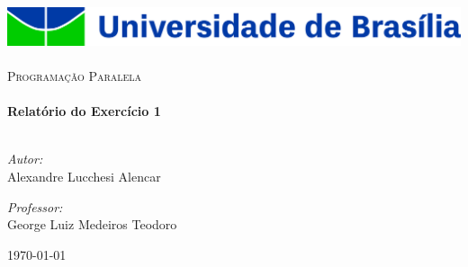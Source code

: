 \begin{titlepage}

\begin{center}

\includegraphics[width=1.0\textwidth]{img/unb_logo.jpg}~\\[1cm]

\textsc{\Large Programação Paralela}\\[0.5cm]

\HRule\\[0.4cm]
{\huge \bfseries Relatório do Exercício 1\\[0.4cm]}
\HRule\\[1.5cm]

\begin{minipage}{0.4\textwidth}
\begin{flushleft} \large
\textit{Autor:}\\
\small{Alexandre Lucchesi Alencar}
\end{flushleft}
\end{minipage}
\begin{minipage}{0.4\textwidth}
\begin{flushright} \large
\textit{Professor:}\\
\small{George Luiz Medeiros Teodoro}
\end{flushright}
\end{minipage}

\vfill

{\large \today}

\end{center}

\end{titlepage}

